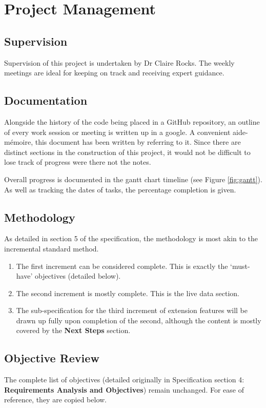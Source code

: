 \documentclass{article}
\begin{document}
\section{Project Management}
\subsection{Supervision}
Supervision of this project is undertaken by Dr Claire Rocks. The weekly meetings are ideal for keeping on track and receiving expert guidance. 

\subsection{Documentation}
Alongside the history of the code being placed in a GitHub repository, an outline of every work session or meeting is written up in a google. A convenient aide-mémoire, this document has been written by referring to it. Since there are distinct sections in the construction of this project, it would not be difficult to lose track of progress were there not the notes. 

Overall progress is documented in the gantt chart timeline (see Figure \ref{fig:gantt}). As well as tracking the dates of tasks, the percentage completion is given.

\subsection{Methodology}
As detailed in section 5 of the specification, the methodology is most akin to the incremental standard method. 

\begin{enumerate}
    \item The first increment can be considered complete. This is exactly the `must-have' objectives (detailed below).
    \item The second increment is mostly complete. This is the live data section.
    \item The sub-specification for the third increment of extension features will be drawn up fully upon completion of the second, although the content is mostly covered by the \textbf{Next Steps} section.
\end{enumerate}

\subsection{Objective Review}
The complete list of objectives (detailed originally in Specification section 4: \textbf{Requirements Analysis and Objectives}) remain unchanged. For ease of reference, they are copied below.
\end{document}
